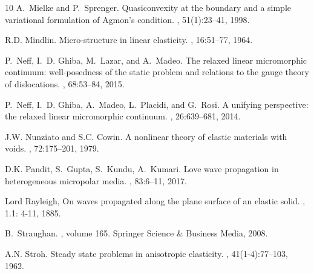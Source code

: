 \documentclass[10pt]{article}
\begin{document}
\begin{footnotesize}
\begin{thebibliography}{10}
	A.~Mielke and P.~Sprenger.
	\newblock Quasiconvexity at the boundary and a simple variational formulation
	of {A}gmon's condition.
	, 51(1):23--41, 1998.
	
	R.D. Mindlin.
	\newblock Micro-structure in linear elasticity.
	, 16:51--77, 1964.
	
	P.~Neff, I.~D. Ghiba, M.~Lazar, and A.~Madeo.
	\newblock The relaxed linear micromorphic continuum: well-posedness of the
	static problem and relations to the gauge theory of dislocations.
	,
	68:53--84, 2015.
	
	P.~Neff, I.~D. Ghiba, A.~Madeo, L.~Placidi, and G.~Rosi.
	\newblock A unifying perspective: the relaxed linear micromorphic continuum.
	, 26:639--681, 2014.
	
	J.W. Nunziato and S.C. Cowin.
	\newblock A nonlinear theory of elastic materials with voids.
	, 72:175--201, 1979.
	
	D.K. Pandit, S.~Gupta, S.~Kundu, A.~Kumari.
	\newblock Love wave propagation in heterogeneous micropolar media.
	, 83:6--11, 2017.
	
	
		{Lord} Rayleigh, \newblock On waves propagated along the plane surface of an elastic solid. , 1.1: 4-11, 1885.
	
	B.~Straughan.
	, volume 165.
	\newblock Springer Science \& Business Media, 2008.
	
	A.N. Stroh.
	\newblock Steady state problems in anisotropic elasticity.
	, 41(1-4):77--103, 1962.
	
\end{thebibliography}




\appendix


\end{footnotesize}
\end{document}
